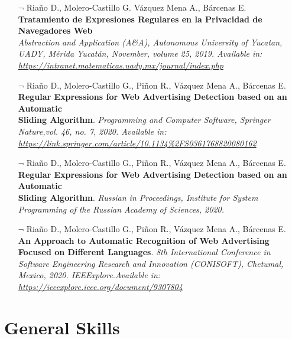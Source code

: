\documentclass[]{friggeri-cv}
\begin{document}
\begin{itemize}
    \item [$¬$] Riaño D., Molero-Castillo G. Vázquez Mena A., Bárcenas E.\\
    \textbf{Tratamiento de Expresiones Regulares en la Privacidad de Navegadores Web}\\
    \emph {Abstraction and Application (A\&A), Autonomous University of Yucatan, UADY, Mérida Yucatán, November, volume 25, 2019. Available in:\\ \url{https://intranet.matematicas.uady.mx/journal/index.php}}
    
    \item [$¬$] Riaño D., Molero-Castillo G., Piñon R., Vázquez Mena A., Bárcenas E.\\
    \textbf{Regular Expressions for Web Advertising Detection based on an Automatic \\Sliding Algorithm}.
    \emph{Programming and Computer Software, Springer Nature,vol. 46, no. 7, 2020. Available in:\\ \url{https://link.springer.com/article/10.1134\%2FS0361768820080162}}
    
    \item [$¬$] Riaño D., Molero-Castillo G., Piñon R., Vázquez Mena A., Bárcenas E.\\
    \textbf{Regular Expressions for Web Advertising Detection based on an Automatic \\Sliding Algorithm}.
    \emph{Russian in Proceedings, Institute for System Programming of the Russian Academy of Sciences, 2020.}
    
    \item [$¬$] Riaño D., Molero-Castillo G., Piñon R., Vázquez Mena A., Bárcenas E.\\
    \textbf{An Approach to Automatic Recognition of Web Advertising Focused on Different Languages}.
    \emph{8th International Conference in Software Engineering Research and Innovation (CONISOFT), Chetumal, Mexico, 2020. IEEExplore.Available in:\\
    \url{https://ieeexplore.ieee.org/document/9307804}}
    
\end{itemize}

\section{General Skills}
\end{document}
